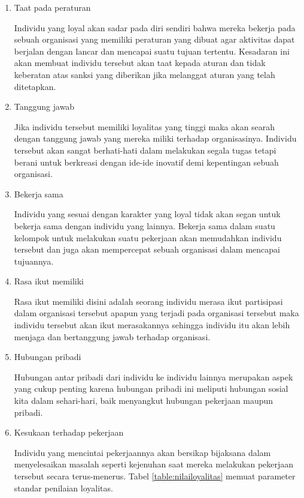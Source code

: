 \begin{enumerate}
\item Taat pada peraturan \par
Individu yang loyal akan sadar pada diri sendiri bahwa mereka bekerja pada sebuah organisasi yang memiliki peraturan yang dibuat agar aktivitas dapat berjalan dengan lancar dan mencapai suatu tujuan tertentu. Kesadaran ini akan membuat individu tersebut akan taat kepada aturan dan tidak keberatan atas sanksi yang diberikan jika melanggat aturan yang telah ditetapkan.

\item Tanggung jawab \par
Jika individu tersebut memiliki loyalitas yang tinggi maka akan searah dengan tanggung jawab yang mereka miliki terhadap organisasinya. Individu tersebut akan sangat berhati-hati dalam melakukan segala tugas tetapi berani untuk berkreasi dengan ide-ide inovatif demi kepentingan sebuah organisasi.

\item Bekerja sama \par
Individu yang sesuai dengan karakter yang loyal tidak akan segan untuk bekerja sama dengan individu yang lainnya. Bekerja sama dalam suatu kelompok untuk melakukan suatu pekerjaan akan memudahkan individu tersebut dan juga akan mempercepat sebuah organisasi dalam mencapai tujuannya.

\item Rasa ikut memiliki \par 
Rasa ikut memiliki disini adalah seorang individu merasa ikut partisipasi dalam organisasi tersebut apapun yang terjadi pada organisasi tersebut maka individu tersebut akan ikut merasakannya sehingga individu itu akan lebih menjaga dan bertanggung jawab terhadap organisasi.

\item Hubungan pribadi \par 
Hubungan antar pribadi dari individu ke individu lainnya merupakan aspek yang cukup penting karena hubungan pribadi ini meliputi hubungan sosial kita dalam sehari-hari, baik menyangkut hubungan pekerjaan maupun pribadi.

\item Kesukaan terhadap pekerjaan \par 
Individu yang mencintai pekerjaannya akan bersikap bijaksana dalam menyelesaikan masalah seperti kejenuhan saat mereka melakukan pekerjaan tersebut secara terus-menerus. Tabel \ref{table:nilailoyalitas} memuat parameter standar penilaian loyalitas.
\end{enumerate}


